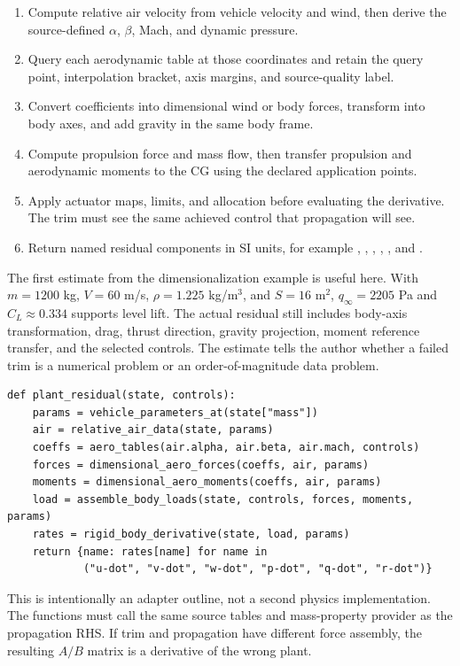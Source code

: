 \documentclass[11pt]{article}
\newcommand{\pathcode}[1]{\path{#1}}
\begin{document}
\begin{enumerate}
  \item Compute relative air velocity from vehicle velocity and wind, then
    derive the source-defined $\alpha$, $\beta$, Mach, and dynamic pressure.
  \item Query each aerodynamic table at those coordinates and retain the query
    point, interpolation bracket, axis margins, and source-quality label.
  \item Convert coefficients into dimensional wind or body forces, transform
    into body axes, and add gravity in the same body frame.
  \item Compute propulsion force and mass flow, then transfer propulsion and
    aerodynamic moments to the CG using the declared application points.
  \item Apply actuator maps, limits, and allocation before evaluating the
    derivative. The trim must see the same achieved control that propagation
    will see.
  \item Return named residual components in SI units, for example
    \pathcode{u-dot}, \pathcode{v-dot}, \pathcode{w-dot},
    \pathcode{p-dot}, \pathcode{q-dot}, and \pathcode{r-dot}.
\end{enumerate}

The first estimate from the dimensionalization example is useful here. With
$m=1200$ kg, $V=60$ m/s, $\rho=1.225$ kg/m$^3$, and $S=16$ m$^2$,
$q_\infty=2205$ Pa and $C_L\approx0.334$ supports level lift. The actual
residual still includes body-axis transformation, drag, thrust direction,
gravity projection, moment reference transfer, and the selected controls.
The estimate tells the author whether a failed trim is a numerical problem or
an order-of-magnitude data problem.

\begin{lstlisting}
def plant_residual(state, controls):
    params = vehicle_parameters_at(state["mass"])
    air = relative_air_data(state, params)
    coeffs = aero_tables(air.alpha, air.beta, air.mach, controls)
    forces = dimensional_aero_forces(coeffs, air, params)
    moments = dimensional_aero_moments(coeffs, air, params)
    load = assemble_body_loads(state, controls, forces, moments, params)
    rates = rigid_body_derivative(state, load, params)
    return {name: rates[name] for name in
            ("u-dot", "v-dot", "w-dot", "p-dot", "q-dot", "r-dot")}
\end{lstlisting}

This is intentionally an adapter outline, not a second physics implementation.
The functions must call the same source tables and mass-property provider as
the propagation RHS. If trim and propagation have different force assembly,
the resulting $A/B$ matrix is a derivative of the wrong plant.
\end{document}
